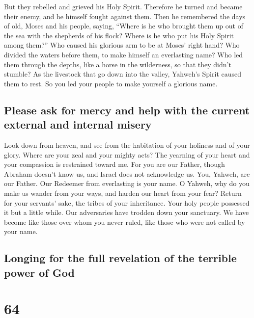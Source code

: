  But they rebelled and grieved his Holy Spirit. Therefore
he turned and became their enemy, and he himself fought against them.
 Then he remembered the days of old, Moses and his
people, saying, ``Where is he who brought them up out of the sea with
the shepherds of his flock? Where is he who put his Holy Spirit among
them?''  Who caused his glorious arm to be at Moses'
right hand? Who divided the waters before them, to make himself an
everlasting name?  Who led them through the depths, like
a horse in the wilderness, so that they didn't stumble? 
As the livestock that go down into the valley, Yahweh's Spirit caused
them to rest. So you led your people to make yourself a glorious name.

\hypertarget{please-ask-for-mercy-and-help-with-the-current-external-and-internal-misery}{%
\subsection{Please ask for mercy and help with the current external and
internal
misery}\label{please-ask-for-mercy-and-help-with-the-current-external-and-internal-misery}}

 Look down from heaven, and see from the habitation of
your holiness and of your glory. Where are your zeal and your mighty
acts? The yearning of your heart and your compassion is restrained
toward me.  For you are our Father, though Abraham
doesn't know us, and Israel does not acknowledge us. You, Yahweh, are
our Father. Our Redeemer from everlasting is your name. 
O Yahweh, why do you make us wander from your ways, and harden our heart
from your fear? Return for your servants' sake, the tribes of your
inheritance.  Your holy people possessed it but a little
while. Our adversaries have trodden down your sanctuary. 
We have become like those over whom you never ruled, like those who were
not called by your name.

\hypertarget{longing-for-the-full-revelation-of-the-terrible-power-of-god}{%
\subsection{Longing for the full revelation of the terrible power of
God}\label{longing-for-the-full-revelation-of-the-terrible-power-of-god}}

\hypertarget{section-63}{%
\section{64}\label{section-63}}

